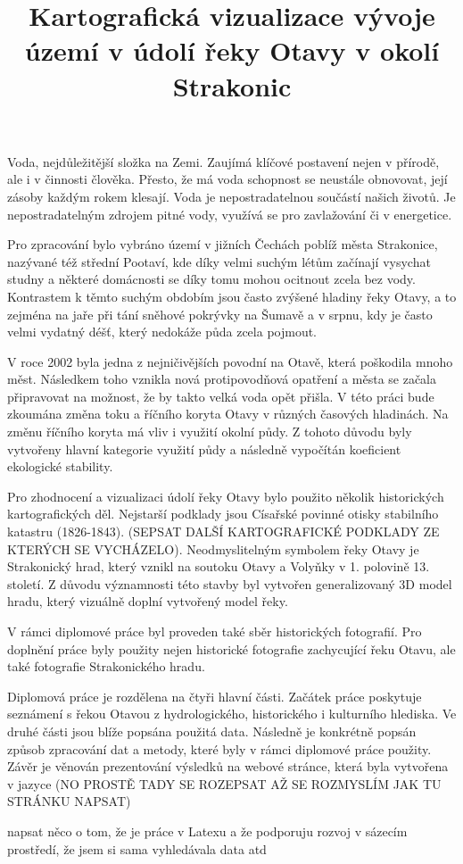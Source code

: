 \documentclass[thesis=M,czech]{FITthesis}[2012/06/26]
\title{Kartografická vizualizace vývoje území v údolí řeky Otavy v okolí Strakonic}
\begin{document}

\begin{introduction}
Voda, nejdůležitější složka na Zemi. Zaujímá klíčové postavení nejen v přírodě, ale i v činnosti člověka. Přesto, že má voda schopnost se neustále obnovovat, její zásoby každým rokem klesají. Voda je nepostradatelnou součástí našich životů. Je nepostradatelným zdrojem pitné vody, využívá se pro zavlažování či v energetice. 

Pro zpracování bylo vybráno území v jižních Čechách poblíž města Strakonice, nazývané též střední Pootaví, kde díky velmi suchým létům začínají vysychat studny a některé domácnosti se díky tomu mohou ocitnout zcela bez vody. Kontrastem k těmto suchým obdobím jsou často zvýšené hladiny řeky Otavy, a to zejména na jaře při tání sněhové pokrývky na Šumavě a v srpnu, kdy je často velmi vydatný déšť, který nedokáže půda zcela pojmout.

V roce 2002 byla jedna z nejničivějších povodní na Otavě, která poškodila mnoho měst. Následkem toho vznikla nová protipovodňová opatření a města se začala připravovat na možnost, že by takto velká voda opět přišla. V této práci bude zkoumána změna toku a říčního koryta Otavy v různých časových hladinách. Na změnu říčního koryta má vliv i využití okolní půdy. Z tohoto důvodu byly vytvořeny hlavní kategorie využití půdy a následně vypočítán koeficient ekologické stability. 

Pro zhodnocení a vizualizaci údolí řeky Otavy bylo použito několik historických kartografických děl. Nejstarší podklady jsou Císařské povinné otisky stabilního katastru (1826-1843). (SEPSAT DALŠÍ KARTOGRAFICKÉ PODKLADY ZE KTERÝCH SE VYCHÁZELO). Neodmyslitelným symbolem řeky Otavy je Strakonický hrad, který vznikl na soutoku Otavy a Volyňky v 1. polovině 13. století. Z důvodu významnosti této stavby byl vytvořen generalizovaný 3D model hradu, který vizuálně doplní vytvořený model řeky. 

V rámci diplomové práce byl proveden také sběr historických fotografií. Pro doplnění práce byly použity nejen historické fotografie zachycující řeku Otavu, ale také fotografie Strakonického hradu. 

Diplomová práce je rozdělena na čtyři hlavní části. Začátek práce poskytuje seznámení s řekou Otavou z hydrologického, historického i kulturního hlediska. Ve druhé části jsou blíže popsána použitá data. Následně je konkrétně popsán způsob zpracování dat a metody, které byly v rámci diplomové práce použity. Závěr je věnován prezentování výsledků na webové stránce, která byla vytvořena v jazyce (NO PROSTĚ TADY SE ROZEPSAT AŽ SE ROZMYSLÍM JAK TU STRÁNKU NAPSAT)

napsat něco o tom, že je práce v Latexu a že podporuju rozvoj v sázecím prostředí, že jsem si sama vyhledávala data atd


\end{introduction}
\end{document}
